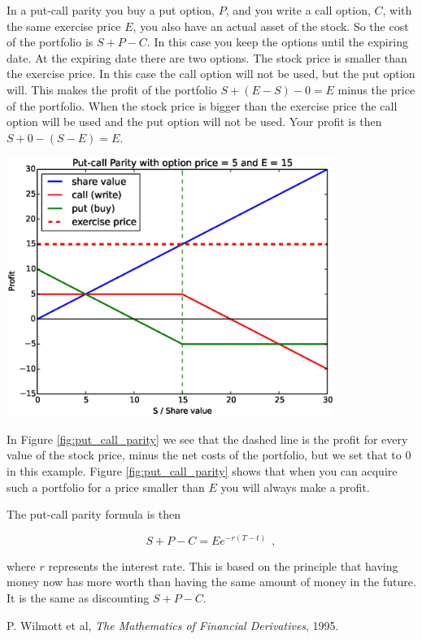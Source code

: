 \documentclass[8 pt]{article}
\newenvironment{Figure}
  {\par\medskip\noindent\minipage{\linewidth}}
  {\endminipage\par\medskip}
\begin{document}
\begin{multicols*}{2}
In a put-call parity you buy a put option, $P$, and you write a call option, $C$, with the same exercise price $E$, you also have an actual asset of the stock. So the cost of the portfolio is $S + P - C$. In this case you keep the options until the expiring date. At the expiring date there are two options. The stock price is smaller than the exercise price. In this case the call option will not be used, but the put option will. This makes the profit of the portfolio $S + ( E - S ) - 0 = E$ minus the price of the portfolio. When the stock price is bigger than the exercise price the call option will be used and the put option will not be used. Your profit is then $S + 0 - ( S - E ) = E$.

\begin{Figure}
  \begin{center}
    \includegraphics[width=0.8\textwidth]{graphs/put_call_parity.eps}
    \label{fig:put_call_parity}
  \end{center}
\end{Figure}

In Figure \ref{fig:put_call_parity} we see that the dashed line is the profit for every value of the stock price, minus the net costs of the portfolio, but we set that to 0 in this example. Figure \ref{fig:put_call_parity} shows that when you can acquire such a portfolio for a price smaller than $E$ you will always make a profit.

The put-call parity formula is then

\begin{equation*}
    S + P - C = E e^{-r(T-t)} ~~,
\end{equation*}

where $r$ represents the interest rate. This is based on the principle that having money now has more worth than having the same amount of money in the future. It is the same as discounting $S + P - C$.

\begin{thebibliography}{28}
\raggedright
{}

 P. Wilmott et al, \emph{The Mathematics of Financial Derivatives}, 1995.

\end{thebibliography}

\end{multicols*}
\end{document}
